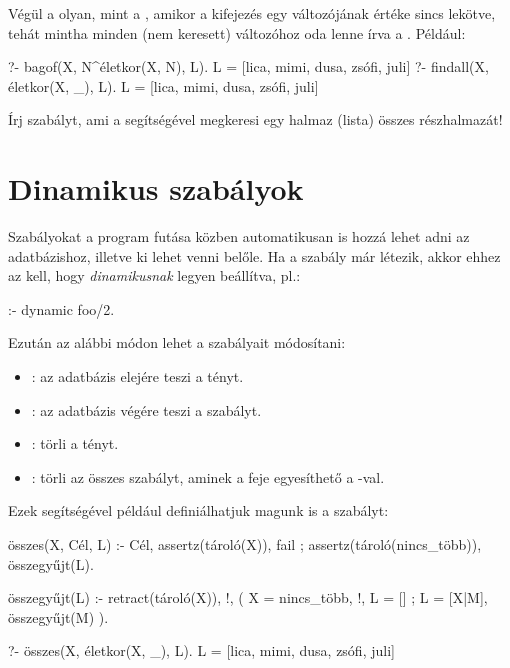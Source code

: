 Végül a  olyan, mint a ,
amikor a kifejezés egy változójának értéke sincs
lekötve, tehát mintha minden (nem keresett) 
változóhoz oda lenne írva a
. Például:
\begin{query}
?- bagof(X, N^életkor(X, N), L).
L = [lica, mimi, dusa, zsófi, juli]
?- findall(X, életkor(X, _), L).
L = [lica, mimi, dusa, zsófi, juli]
\end{query}

\begin{problem}
Írj szabályt, ami a  segítségével
megkeresi egy halmaz (lista) összes részhalmazát!
\end{problem}

\section{Dinamikus szabályok}
Szabályokat a program futása közben automatikusan is
hozzá lehet adni az adatbázishoz, illetve ki lehet
venni belőle. Ha a szabály már létezik, akkor ehhez
az kell, hogy \emph{dinamikusnak} legyen beállítva,
pl.:
\begin{program}
:- dynamic foo/2. %
\end{program}
Ezután az alábbi módon lehet a  szabályait
módosítani:
\begin{itemize}
\item {} : az adatbázis
  elejére teszi a  tényt.
\item {} : az
  adatbázis végére teszi a 
  szabályt.
\item {} : törli a
   tényt.
\item {} : törli az összes
  szabályt, aminek a feje egyesíthető a
  -val.
\end{itemize}
Ezek segítségével például definiálhatjuk magunk is a
 szabályt:
\begin{program}
összes(X, Cél, L) :-
    Cél, assertz(tároló(X)), fail
  ; assertz(tároló(nincs_több)), összegyűjt(L).

összegyűjt(L) :-
    retract(tároló(X)), !,
    ( X = nincs_több, !, L = []
    ; L = [X|M], összegyűjt(M)
    ).
\end{program}
\begin{query}
?- összes(X, életkor(X, _), L).
L = [lica, mimi, dusa, zsófi, juli]
\end{query}

